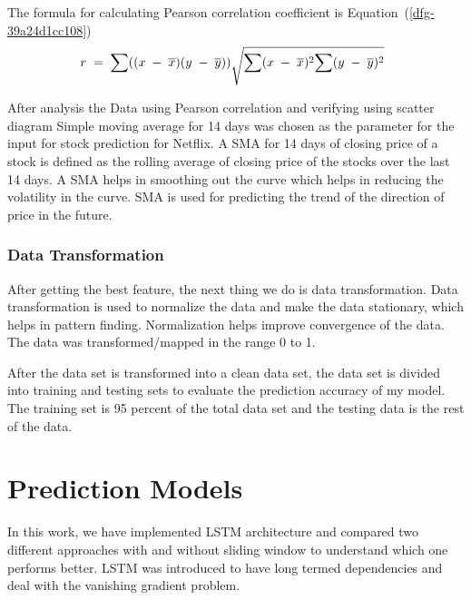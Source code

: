 \documentclass[5p,,preprint,12pt,twocolumn]{elsarticle}
\begin{document}
The formula for calculating Pearson correlation coefficient is Equation~(\ref{dfg-39a24d1cc108})
\let\saveeqnno\theequation
\let\savefrac\frac
\def\dispfrac{\displaystyle\savefrac}
\begin{eqnarray}
\let\frac\dispfrac
\gdef\theequation{1}
\let\theHequation\theequation
\label{dfg-39a24d1cc108}
\begin{array}{@{}l}r\;=\;\frac{\sum_{}((x\;-\;\overline x)(y\;-\;\overline y))}{\sqrt{{\displaystyle\sum_{}}(x\;-\;\overline x)^{2}{\displaystyle\sum_{}}(y\;-\;\overline y)^{2}}}\end{array}
\end{eqnarray}
\global\let\theequation\saveeqnno
\addtocounter{equation}{-1}\ignorespaces 
After analysis the Data using Pearson correlation and verifying using scatter diagram Simple moving average for 14 days was chosen as the parameter for the input for stock prediction for Netflix. A SMA for 14 days of closing price of a stock is defined as the rolling average of closing price of the stocks over the last 14 days. A SMA helps in smoothing out the curve which helps in reducing the volatility in the curve. SMA is used for predicting the trend of the direction of price in the future.



\subsubsection{Data Transformation}After getting the best feature, the next thing we do is data transformation. Data transformation is used to normalize the data and make the data stationary, which helps in pattern finding. Normalization helps improve convergence of the data. The data was transformed/mapped in the range 0 to 1.

After the data set is transformed into a clean data set, the data set is divided into training and testing sets to evaluate the prediction accuracy of my model. The training set is 95 percent of the total data set and the testing data is the rest of the data.
    
\section{Prediction Models}
In this work, we have implemented LSTM architecture and compared two different approaches with and without sliding window to understand which one performs better. LSTM was introduced to have long termed dependencies and deal with the vanishing gradient problem.
\end{document}
